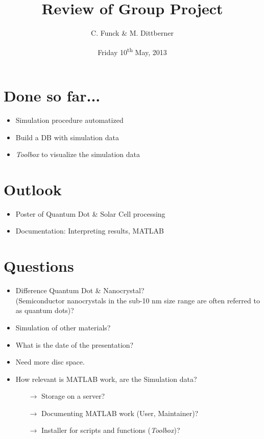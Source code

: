 \documentclass[a4paper, 11pt, landscape]{article}
\title{Review of Group Project}
\author{C. Funck \& M. Dittberner}
\date{Friday 10\textsuperscript{th} May, 2013}
\begin{document}
	\maketitle
	\vfill
	
	\begin{multicols}{3}
		\section{Done so far...}
			\begin{itemize}
				\itemsep 0pt
				\item Simulation procedure automatized
				\item Build a DB with simulation data
				\item {\it Toolbox} to visualize the simulation data
			\end{itemize}
		
		\vfill
		\columnbreak
		
		\section{Outlook}
			\begin{itemize}
				\itemsep 0pt
				
				\item Poster of Quantum Dot \& Solar Cell processing
				\item Documentation: Interpreting results, MATLAB
			\end{itemize}		
		
		\vfill
		\columnbreak
		
		\section{Questions}
			\begin{itemize}
				\itemsep 0pt
				\item Difference Quantum Dot \& Nanocrystal? \\
							(Semiconductor nanocrystals in the sub-10 nm size range are often referred to as quantum dots)?
				\item Simulation of other materials?
				\item What is the date of the presentation?
				\item Need more disc space.
				\item How relevant is MATLAB work, are the Simulation data?
							\begin{itemize}
								\itemsep 0pt
								\item[$\rightarrow$] Storage on a server?
								\item[$\rightarrow$] Documenting MATLAB work (User, Maintainer)?
								\item[$\rightarrow$] Installer for scripts and functions ({\it Toolbox})?
							\end{itemize}
			\end{itemize}
	\end{multicols}
		
\end{document}
